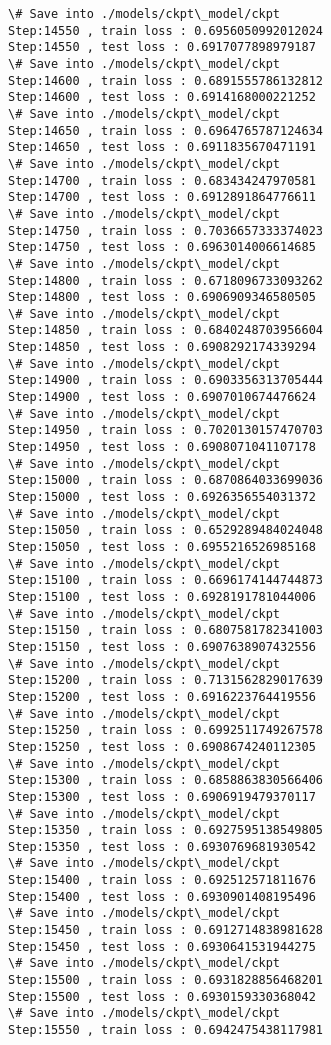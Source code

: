 \documentclass[11pt]{article}
\begin{document}
\begin{Verbatim}[commandchars=\\\{\}]
\# Save into ./models/ckpt\_model/ckpt
Step:14550 , train loss : 0.6956050992012024
Step:14550 , test loss : 0.6917077898979187
\# Save into ./models/ckpt\_model/ckpt
Step:14600 , train loss : 0.6891555786132812
Step:14600 , test loss : 0.6914168000221252
\# Save into ./models/ckpt\_model/ckpt
Step:14650 , train loss : 0.6964765787124634
Step:14650 , test loss : 0.6911835670471191
\# Save into ./models/ckpt\_model/ckpt
Step:14700 , train loss : 0.683434247970581
Step:14700 , test loss : 0.6912891864776611
\# Save into ./models/ckpt\_model/ckpt
Step:14750 , train loss : 0.7036657333374023
Step:14750 , test loss : 0.6963014006614685
\# Save into ./models/ckpt\_model/ckpt
Step:14800 , train loss : 0.6718096733093262
Step:14800 , test loss : 0.6906909346580505
\# Save into ./models/ckpt\_model/ckpt
Step:14850 , train loss : 0.6840248703956604
Step:14850 , test loss : 0.6908292174339294
\# Save into ./models/ckpt\_model/ckpt
Step:14900 , train loss : 0.6903356313705444
Step:14900 , test loss : 0.6907010674476624
\# Save into ./models/ckpt\_model/ckpt
Step:14950 , train loss : 0.7020130157470703
Step:14950 , test loss : 0.6908071041107178
\# Save into ./models/ckpt\_model/ckpt
Step:15000 , train loss : 0.6870864033699036
Step:15000 , test loss : 0.6926356554031372
\# Save into ./models/ckpt\_model/ckpt
Step:15050 , train loss : 0.6529289484024048
Step:15050 , test loss : 0.6955216526985168
\# Save into ./models/ckpt\_model/ckpt
Step:15100 , train loss : 0.6696174144744873
Step:15100 , test loss : 0.6928191781044006
\# Save into ./models/ckpt\_model/ckpt
Step:15150 , train loss : 0.6807581782341003
Step:15150 , test loss : 0.6907638907432556
\# Save into ./models/ckpt\_model/ckpt
Step:15200 , train loss : 0.7131562829017639
Step:15200 , test loss : 0.6916223764419556
\# Save into ./models/ckpt\_model/ckpt
Step:15250 , train loss : 0.6992511749267578
Step:15250 , test loss : 0.6908674240112305
\# Save into ./models/ckpt\_model/ckpt
Step:15300 , train loss : 0.6858863830566406
Step:15300 , test loss : 0.6906919479370117
\# Save into ./models/ckpt\_model/ckpt
Step:15350 , train loss : 0.6927595138549805
Step:15350 , test loss : 0.6930769681930542
\# Save into ./models/ckpt\_model/ckpt
Step:15400 , train loss : 0.692512571811676
Step:15400 , test loss : 0.6930901408195496
\# Save into ./models/ckpt\_model/ckpt
Step:15450 , train loss : 0.6912714838981628
Step:15450 , test loss : 0.6930641531944275
\# Save into ./models/ckpt\_model/ckpt
Step:15500 , train loss : 0.6931828856468201
Step:15500 , test loss : 0.6930159330368042
\# Save into ./models/ckpt\_model/ckpt
Step:15550 , train loss : 0.6942475438117981

\end{Verbatim}
\end{document}
